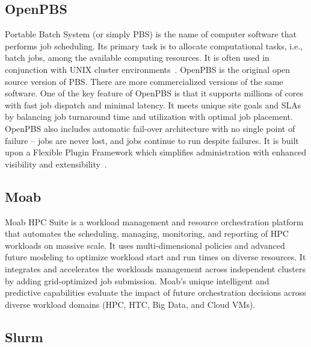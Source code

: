 {     \pv

\subsection{OpenPBS}

Portable Batch System (or simply PBS) is the name of computer software
that performs job scheduling. Its primary task is to allocate
computational tasks, i.e., batch jobs, among the available computing
resources. It is often used in conjunction with UNIX cluster
environments~\cite{openpbs-wiki}. OpenPBS is the original open source
version of PBS. There are more commercialized versions of the same
software. One of the key feature of OpenPBS is that it supports
millions of cores with fast job dispatch and minimal latency. It meets
unique site goals and SLAs by balancing job turnaround time and
utilization with optimal job placement. OpenPBS also includes
automatic fail-over architecture with no single point of failure –
jobs are never lost, and jobs continue to run despite failures. It is
built upon a Flexible Plugin Framework which simplifies administration
with enhanced visibility and extensibility~\cite{openpbs-www}.

\subsection{Moab}

     Moab HPC Suite is a workload management and resource orchestration
     platform that automates the scheduling, managing, monitoring, and
     reporting of HPC workloads on massive scale. It uses multi-dimensional
     policies and advanced future modeling to optimize workload start and
     run times on diverse resources. It integrates and accelerates the
     workloads management across independent clusters by adding
     grid-optimized job submission. Moab's unique intelligent and
     predictive capabilities evaluate the impact of future orchestration
     decisions across diverse workload domains (HPC, HTC, Big Data, and
     Cloud VMs)\cite{www-moab}.

\subsection{Slurm }

}
